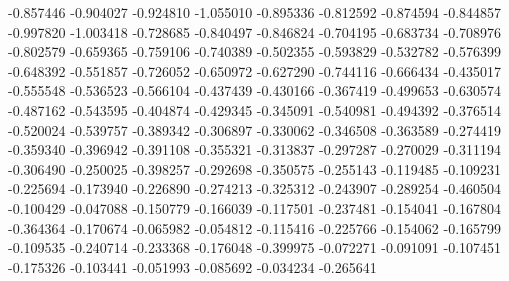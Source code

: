 -0.857446
-0.904027
-0.924810
-1.055010
-0.895336
-0.812592
-0.874594
-0.844857
-0.997820
-1.003418
-0.728685
-0.840497
-0.846824
-0.704195
-0.683734
-0.708976
-0.802579
-0.659365
-0.759106
-0.740389
-0.502355
-0.593829
-0.532782
-0.576399
-0.648392
-0.551857
-0.726052
-0.650972
-0.627290
-0.744116
-0.666434
-0.435017
-0.555548
-0.536523
-0.566104
-0.437439
-0.430166
-0.367419
-0.499653
-0.630574
-0.487162
-0.543595
-0.404874
-0.429345
-0.345091
-0.540981
-0.494392
-0.376514
-0.520024
-0.539757
-0.389342
-0.306897
-0.330062
-0.346508
-0.363589
-0.274419
-0.359340
-0.396942
-0.391108
-0.355321
-0.313837
-0.297287
-0.270029
-0.311194
-0.306490
-0.250025
-0.398257
-0.292698
-0.350575
-0.255143
-0.119485
-0.109231
-0.225694
-0.173940
-0.226890
-0.274213
-0.325312
-0.243907
-0.289254
-0.460504
-0.100429
-0.047088
-0.150779
-0.166039
-0.117501
-0.237481
-0.154041
-0.167804
-0.364364
-0.170674
-0.065982
-0.054812
-0.115416
-0.225766
-0.154062
-0.165799
-0.109535
-0.240714
-0.233368
-0.176048
-0.399975
-0.072271
-0.091091
-0.107451
-0.175326
-0.103441
-0.051993
-0.085692
-0.034234
-0.265641
